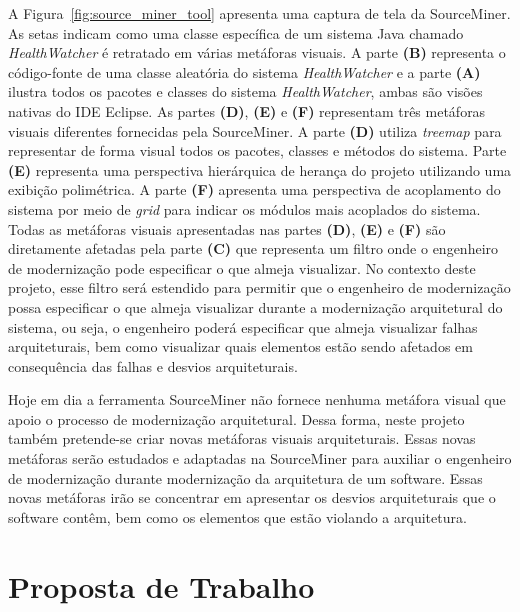 \documentclass[12pt]{article}
\begin{document}
A Figura~\ref{fig:source_miner_tool} apresenta uma captura de tela da SourceMiner. As setas indicam como uma classe específica de um sistema Java chamado \textit{HealthWatcher} é retratado em várias metáforas visuais. A parte \textbf{(B)} representa o código-fonte de uma classe aleatória do sistema \textit{HealthWatcher} e a parte \textbf{(A)} ilustra todos os pacotes e classes do sistema \textit{HealthWatcher}, ambas são visões nativas do IDE Eclipse. As partes \textbf{(D)}, \textbf{(E)} e \textbf{(F)} representam três metáforas visuais diferentes fornecidas pela SourceMiner. A parte \textbf{(D)} utiliza \textit{treemap} para representar de forma visual todos os pacotes, classes e métodos do sistema. Parte \textbf{(E)} representa uma perspectiva hierárquica de herança do projeto utilizando uma exibição polimétrica. A parte \textbf{(F)} apresenta uma perspectiva de acoplamento do sistema por meio de \textit{grid} para indicar os módulos mais acoplados do sistema. Todas as metáforas visuais apresentadas nas partes \textbf{(D)}, \textbf{(E)} e \textbf{(F)} são diretamente afetadas pela parte \textbf{(C)} que representa um filtro onde o engenheiro de modernização pode especificar o que almeja visualizar. No contexto deste projeto, esse filtro será estendido para permitir que o engenheiro de modernização possa especificar o que almeja visualizar durante a modernização arquitetural do sistema, ou seja, o engenheiro poderá especificar que almeja visualizar falhas arquiteturais, bem como visualizar quais elementos estão sendo afetados em consequência das falhas e desvios arquiteturais.

Hoje em dia a ferramenta SourceMiner não fornece nenhuma metáfora visual que apoio o processo de modernização arquitetural. Dessa forma, neste projeto também pretende-se criar novas metáforas visuais arquiteturais. Essas novas metáforas serão estudados e adaptadas na SourceMiner para auxiliar o engenheiro de modernização durante modernização da arquitetura de um software. Essas novas metáforas irão se concentrar em apresentar os desvios arquiteturais que o software contêm, bem como os elementos que estão violando a arquitetura. 

\section{Proposta de Trabalho}\label{sec:proposta_de_trabalho}
\end{document}
